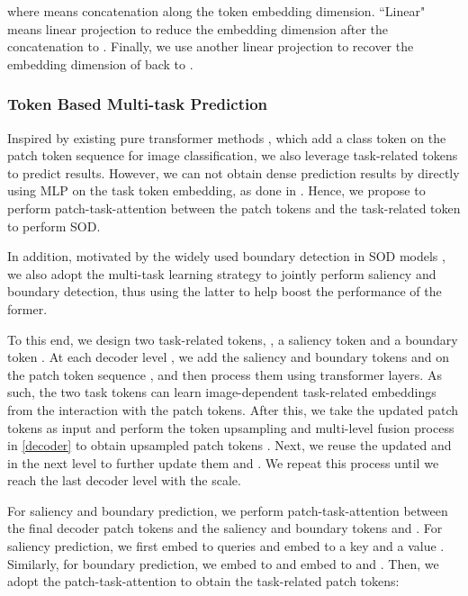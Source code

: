\documentclass[10pt,twocolumn,letterpaper]{article}
\begin{document}
where  means concatenation along the token embedding dimension. ``Linear" means linear projection to reduce the embedding dimension after the concatenation to . Finally, we use another linear projection to recover the embedding dimension of  back to .



\subsubsection{Token Based Multi-task Prediction}
Inspired by existing pure transformer methods \cite{yuan2021tokens,dosovitskiy2020image}, which add a class token on the patch token sequence for image classification, we also leverage task-related tokens to predict results.
However, we can not obtain dense prediction results by directly using MLP on the task token embedding, as done in \cite{yuan2021tokens,dosovitskiy2020image}. Hence, we propose to perform patch-task-attention between the patch tokens and the task-related token to perform SOD.

In addition, motivated by the widely used boundary detection in SOD models \cite{zhao2019EGNet,CVPR2020_LDF,zhang2020select,Wei2020CoNet}, we also adopt the multi-task learning strategy to jointly perform saliency and boundary detection, thus using the latter to help boost the performance of the former.


To this end, we design two task-related tokens, \ie, a saliency token  and a boundary token .
At each decoder level , we add the saliency and boundary tokens  and  on the patch token sequence , and then process them using  transformer layers. As such, the two task tokens can learn image-dependent task-related embeddings from the interaction with the patch tokens. After this, we take the updated patch tokens as input and perform the token upsampling and multi-level fusion process in \eqref{decoder} to obtain upsampled patch tokens . Next, we reuse the updated  and  in the next level  to further update them and . We repeat this process until we reach the last decoder level with the  scale.





For saliency and boundary prediction, we perform patch-task-attention between the final decoder patch tokens  and the saliency and boundary tokens  and .
For saliency prediction, we first embed  to queries  and embed  to a key  and a value .
Similarly, for boundary prediction, we embed  to  and embed  to  and .
Then, we adopt the patch-task-attention to obtain the task-related patch tokens:
\end{document}
